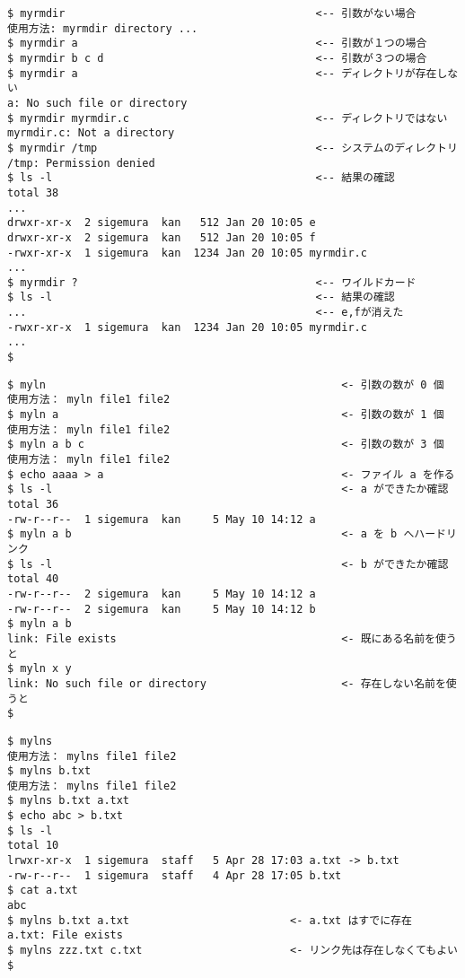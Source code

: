 \documentclass[a4j,twcolumn,11pt,nomag]{ltjarticle}      %
\begin{document}
\begin{enumerate}
\begin{lstlisting}[caption=myrmdirの実行例（動作テスト！！）]
$ myrmdir                                       <-- 引数がない場合
使用方法: myrmdir directory ...
$ myrmdir a                                     <-- 引数が１つの場合
$ myrmdir b c d                                 <-- 引数が３つの場合
$ myrmdir a                                     <-- ディレクトリが存在しない
a: No such file or directory
$ myrmdir myrmdir.c                             <-- ディレクトリではない
myrmdir.c: Not a directory
$ myrmdir /tmp                                  <-- システムのディレクトリ
/tmp: Permission denied
$ ls -l                                         <-- 結果の確認
total 38
...
drwxr-xr-x  2 sigemura  kan   512 Jan 20 10:05 e
drwxr-xr-x  2 sigemura  kan   512 Jan 20 10:05 f
-rwxr-xr-x  1 sigemura  kan  1234 Jan 20 10:05 myrmdir.c
...
$ myrmdir ?                                     <-- ワイルドカード
$ ls -l                                         <-- 結果の確認
...                                             <-- e,fが消えた
-rwxr-xr-x  1 sigemura  kan  1234 Jan 20 10:05 myrmdir.c
...
$
\end{lstlisting}

\begin{lstlisting}[caption=mylnの実行例（動作テスト！！）]
$ myln                                              <- 引数の数が 0 個
使用方法： myln file1 file2
$ myln a                                            <- 引数の数が 1 個
使用方法： myln file1 file2
$ myln a b c                                        <- 引数の数が 3 個
使用方法： myln file1 file2
$ echo aaaa > a                                     <- ファイル a を作る
$ ls -l                                             <- a ができたか確認
total 36
-rw-r--r--  1 sigemura  kan     5 May 10 14:12 a
$ myln a b                                          <- a を b へハードリンク
$ ls -l                                             <- b ができたか確認
total 40
-rw-r--r--  2 sigemura  kan     5 May 10 14:12 a
-rw-r--r--  2 sigemura  kan     5 May 10 14:12 b
$ myln a b
link: File exists                                   <- 既にある名前を使うと
$ myln x y
link: No such file or directory                     <- 存在しない名前を使うと
$
\end{lstlisting}

\begin{lstlisting}[caption=mylnsの実行例（動作テスト！！）]
$ mylns
使用方法： mylns file1 file2
$ mylns b.txt
使用方法： mylns file1 file2
$ mylns b.txt a.txt
$ echo abc > b.txt
$ ls -l
total 10
lrwxr-xr-x  1 sigemura  staff   5 Apr 28 17:03 a.txt -> b.txt
-rw-r--r--  1 sigemura  staff   4 Apr 28 17:05 b.txt
$ cat a.txt
abc
$ mylns b.txt a.txt                         <- a.txt はすでに存在
a.txt: File exists
$ mylns zzz.txt c.txt                       <- リンク先は存在しなくてもよい
$ 
\end{lstlisting}


\end{enumerate}
\end{document}
